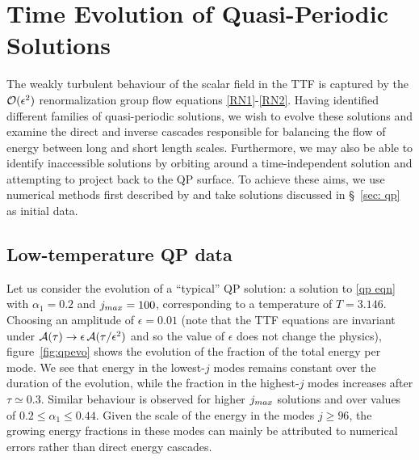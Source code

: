 \documentclass[../PhD.tex]{subfiles}
\begin{document}

\section{Time Evolution of Quasi-Periodic Solutions}
\label{sec: time evolution}

The weakly turbulent behaviour of the scalar field in the TTF is captured by the $\mathcal O(\epsilon^2)$ renormalization group flow equations {\eqref{RN1}-\eqref{RN2}}. Having identified different families of quasi-periodic solutions, we wish to evolve these solutions and examine the direct and inverse cascades responsible for balancing the flow of energy between long and short length scales. Furthermore, we may also be able to identify inaccessible solutions by orbiting around a time-independent solution and attempting to project back to the QP surface. To achieve these aims, we use numerical methods first described by \cite{1606.02712} and take solutions discussed in \S\!~\ref{sec: qp} as initial data. 


\subsection{Low-temperature QP data}

Let us consider the evolution of a ``typical'' QP solution: a solution to \eqref{qp eqn} with $\alpha_1 = 0.2$ and $j_{max} = 100$, corresponding to a temperature of $T = 3.146$. Choosing an amplitude of $\epsilon = 0.01$ (note that the TTF equations are invariant under $\mathcal A(\tau) \to \epsilon \, \mathcal A(\tau / \epsilon^2)$ and so the value of $\epsilon$ does not change the physics), figure~\ref{fig:qpevo} shows the evolution of the fraction of the total energy per mode. We see that energy in the lowest-$j$ modes remains constant over the duration of the evolution, while the fraction in the highest-$j$ modes increases after $\tau \simeq 0.3$. Similar behaviour is observed for higher $j_{max}$ solutions and over values of $0.2 \leq \alpha_1 \leq 0.44$. Given the scale of the energy in the modes $j \geq 96$, the growing energy fractions in these modes can mainly be attributed to numerical errors rather than direct energy cascades.
\\
\end{document}
